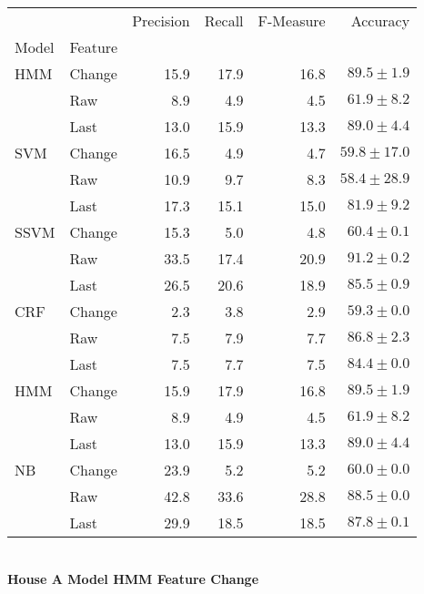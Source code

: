 \documentclass{article}
\begin{document}
\begin{tabular}{llrrrr}
\toprule
    &        &  Precision &  Recall &  F-Measure &       Accuracy \\
Model & Feature &            &         &            &                \\
\midrule
HMM & Change &       15.9 &    17.9 &       16.8 &   $89.5\pm1.9$ \\
    & Raw &        8.9 &     4.9 &        4.5 &   $61.9\pm8.2$ \\
    & Last &       13.0 &    15.9 &       13.3 &   $89.0\pm4.4$ \\
SVM & Change &       16.5 &     4.9 &        4.7 &  $59.8\pm17.0$ \\
    & Raw &       10.9 &     9.7 &        8.3 &  $58.4\pm28.9$ \\
    & Last &       17.3 &    15.1 &       15.0 &   $81.9\pm9.2$ \\
SSVM & Change &       15.3 &     5.0 &        4.8 &   $60.4\pm0.1$ \\
    & Raw &       33.5 &    17.4 &       20.9 &   $91.2\pm0.2$ \\
    & Last &       26.5 &    20.6 &       18.9 &   $85.5\pm0.9$ \\
CRF & Change &        2.3 &     3.8 &        2.9 &   $59.3\pm0.0$ \\
    & Raw &        7.5 &     7.9 &        7.7 &   $86.8\pm2.3$ \\
    & Last &        7.5 &     7.7 &        7.5 &   $84.4\pm0.0$ \\
HMM & Change &       15.9 &    17.9 &       16.8 &   $89.5\pm1.9$ \\
    & Raw &        8.9 &     4.9 &        4.5 &   $61.9\pm8.2$ \\
    & Last &       13.0 &    15.9 &       13.3 &   $89.0\pm4.4$ \\
NB & Change &       23.9 &     5.2 &        5.2 &   $60.0\pm0.0$ \\
    & Raw &       42.8 &    33.6 &       28.8 &   $88.5\pm0.0$ \\
    & Last &       29.9 &    18.5 &       18.5 &   $87.8\pm0.1$ \\
\bottomrule
\end{tabular}
\vspace{1cm}\\
\textbf{House A Model HMM Feature Change}\\
\vspace{1cm}\\
\end{document}

